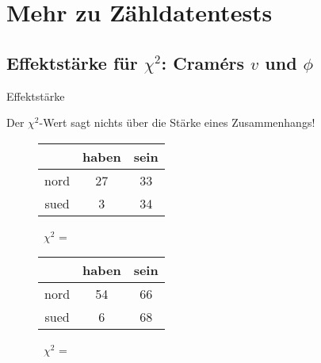 \section{Mehr zu Zähldatentests}


\subsection[Effektstärke]{Effektstärke für $\chi^2$: Cramérs $v$ und $\phi$}

\begin{frame}{Effektstärke}

  Der $\chi^2$-Wert sagt nichts über die \alert{Stärke eines Zusammenhangs}!\\

  \begin{figure}[h]
    \centering
    \begin{tabular}{|c|c|c|}
      \hline
      &  haben & sein\\
      \hline
      nord   &  27      & 33 \\
      \hline
	sued   &   3      & 34 \\
      \hline
    \end{tabular}~$\chi^2$ = ~
  \end{figure}

  \begin{figure}[h]
    \centering
    \begin{tabular}{|c|c|c|}
      \hline
	    &  haben & sein\\
      \hline
	nord   &  54      & 66 \\
      \hline
	sued   &  6     & 68 \\
      \hline
      \end{tabular}~$\chi^2$ = ~
  \end{figure}
\end{frame}


